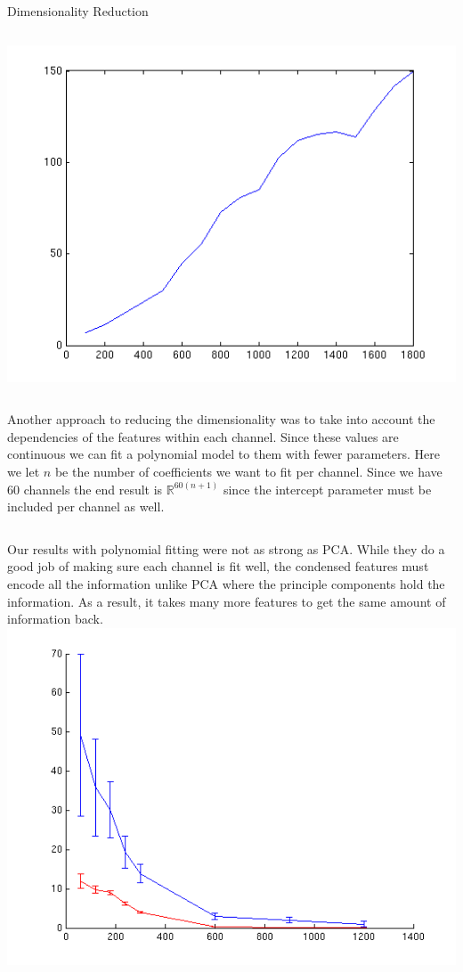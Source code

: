 \documentclass[final,t]{beamer}
\begin{document}
\begin{frame}{}
\begin{columns}[t]
\begin{column}{.3\linewidth}
\begin{block}{Dimensionality Reduction}
\begin{columns}[c]
         \includegraphics[width=0.97\linewidth]{images/dim_vs_runningtime.png}
       \end{columns}
       \vskip4cm
       \par
       Another approach to reducing the dimensionality was to take
       into account the dependencies of the features within each
       channel. Since these values are continuous we can fit a
       polynomial model to them with fewer parameters. Here we let $n$
       be the number of coefficients we want to fit per channel. Since
       we have 60 channels the end result is $\mathbb{R}^{60(n+1)}$
       since the intercept parameter must be included per channel as well.
       \begin{columns}[c]
       Our results with polynomial fitting were not as strong as
       PCA. While they do a good job of making sure each channel is
       fit well, the condensed features must encode all the
       information unlike PCA where the principle components hold the
       information. As a result, it takes many more features to get
       the same amount of information back.
       \includegraphics[width=0.97\linewidth]{images/error_poly_pca.png}

\end{columns}
\end{block}
\end{column}
\end{columns}
\end{frame}
\end{document}
